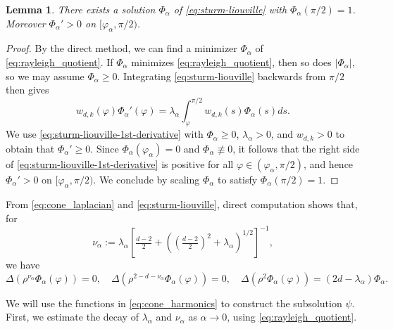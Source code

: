 \documentclass[11pt]{amsart}
\numberwithin{equation}{section}
\numberwithin{figure}{section}
\theoremstyle{plain}
\newtheorem{lem}[thm]{Lemma}
\theoremstyle{definition}
\theoremstyle{remark}
\theoremstyle{plain}
\begin{document}
\begin{lem}\label{lem:first_eigenfunction}
There exists a solution  $\Phi_\alpha$ of \eqref{eq:sturm-liouville} with $\Phi_\alpha(\pi/2) = 1$. Moreover $\Phi_\alpha'>0$ on $[\varphi_\alpha, \pi/2)$.
\end{lem}
\begin{proof}
    By the direct method, we can find a minimizer $\Phi_\alpha$ of \eqref{eq:rayleigh_quotient}. If $\Phi_\alpha$ minimizes \eqref{eq:rayleigh_quotient}, then so does $|\Phi_\alpha|$, so we may assume $\Phi_\alpha \geq 0$. Integrating \eqref{eq:sturm-liouville} backwards from $\pi/2$ then gives
    \begin{equation}\label{eq:sturm-liouville-1st-derivative}
        w_{d,k}(\varphi)\Phi_\alpha'(\varphi) = \lambda_\alpha \int_{\varphi}^{\pi/2} w_{d,k}(s)\Phi_\alpha(s) ds.
    \end{equation}
    We use \eqref{eq:sturm-liouville-1st-derivative} with $\Phi_\alpha \geq 0$, $\lambda_\alpha > 0$, and $w_{d,k} > 0$ to obtain that $\Phi_\alpha' \geq 0$. Since $\Phi_\alpha(\varphi_\alpha) = 0$ and $\Phi_\alpha\not\equiv 0$, it follows that the right side of \eqref{eq:sturm-liouville-1st-derivative} is positive for all $\varphi\in (\varphi_\alpha, \pi/2)$, and hence $\Phi_\alpha' > 0$ on $[\varphi_\alpha, \pi/2)$. We conclude by scaling $\Phi_\alpha$ to satisfy $\Phi_\alpha(\pi/2) = 1$.
\end{proof}

From \eqref{eq:cone_laplacian} and \eqref{eq:sturm-liouville}, direct computation shows that, for
\begin{equation}\label{eq:cone_exponent}
    \nu_\alpha := \lambda_\alpha[\tfrac{d-2}{2} + ((\tfrac{d-2}{2})^2 + \lambda_\alpha)^{1/2}]^{-1},
\end{equation}
we have
\begin{equation}\label{eq:cone_harmonics}
\Delta(\rho^{\nu_\alpha}\Phi_\alpha(\varphi)) = 0, \quad
    \Delta(\rho^{2-d -\nu_\alpha}\Phi_\alpha(\varphi)) =0, \quad
  \Delta(\rho^2\Phi_\alpha(\varphi)) = (2d-\lambda_\alpha)\Phi_\alpha.
\end{equation}

We will use the functions in \eqref{eq:cone_harmonics} to construct the subsolution $\psi$.  First, we estimate the decay of $\lambda_\alpha$ and $\nu_\alpha$ as $\alpha\to 0$, using \eqref{eq:rayleigh_quotient}.
\end{document}
